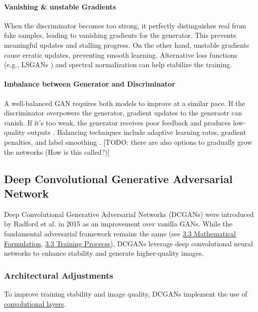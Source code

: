 \paragraph[Vanishing & unstable Gradients]{Vanishing \& unstable Gradients}
When the discriminator becomes too strong, it perfectly distinguishes real from fake samples, leading to vanishing gradients for the generator. This prevents meaningful updates and stalling progress. On the other hand, unstable gradients cause erratic updates, preventing smooth learning. Alternative loss functions (e.g., LSGANs \cite{mao2017squaresgenerativeadversarialnetworks}) and spectral normalization can help stabilize the training.
\paragraph[Imbalance between Generator and Discriminator]{Imbalance between Generator and Discriminator}
A well-balanced GAN requires both models to improve at a similar pace. If the discriminator overpowers the generator, gradient updates to the generaotr can vanish. If it's too weak, the generator receives poor feedback and produces low-quality outputs \cite{goodfellow2014generativeadversarialnetworks}. Balancing techniques include adaptive learning rates, gradient penalties, and label smoothing \cite{Radford2015DCGAN}. [TODO: there are also options to gradually grow the networks (How is this called?)]


\subsection[Deep Convolutional Generative Adversarial Network - DCGAN]{Deep Convolutional Generative Adversarial Network}\label{theoretical_dcgan}
Deep Convolutional Generative Adversarial Networks (DCGANs) were introduced by Radford et al. in 2015 \cite{Radford2015DCGAN} as an improvement over vanilla GANs. While the fundamental adversarial framework remains the same (see \hyperref[theoretical_gan_math]{3.3 Mathematical Formulation}, \hyperref[theoretical_gan_training]{3.3 Training Procecss}), DCGANs leverage deep convolutional neural networks to enhance stability and generate higher-quality images.

\subsubsection{Architectural Adjustments}\label{theorey_dcgan_architecture}
To improve training stability and image quality, DCGANs implement the use of \hyperref[theoretical_classification_conv_layers]{convolutional layers}.

